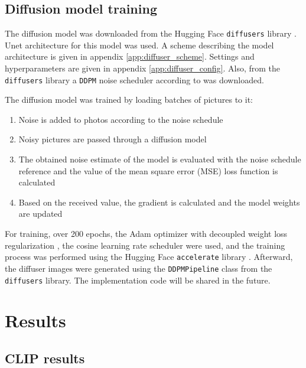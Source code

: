 \documentclass[runningheads]{llncs}
\begin{document}
\subsection{Diffusion model training}

The diffusion model was downloaded from the Hugging Face \texttt{diffusers} library \cite{von-platen-etal-2022-diffusers}. Unet architecture for this model was used. A scheme describing the model architecture is given in appendix \ref{app:diffuser_scheme}. Settings and hyperparameters are given in appendix \ref{app:diffuser_config}. Also, from the \texttt{diffusers} library a \texttt{DDPM} noise scheduler according to \cite{Diffusion_Ho} was downloaded.
\par
The diffusion model was trained by loading batches of pictures to it:
\begin{enumerate}
    \item Noise is added to photos according to the noise schedule
    \item Noisy pictures are passed through a diffusion model
    \item The obtained noise estimate of the model is evaluated with the noise schedule reference and the value of the mean square error (MSE) loss function is calculated
    \item Based on the received value, the gradient is calculated and the model weights are updated
\end{enumerate}
For training, over 200 epochs, the Adam optimizer \cite{Adam} with decoupled weight loss regularization \cite{AdamW}, the cosine learning rate scheduler \cite{CosineScheduler} were used, and the training process was performed using the Hugging Face \texttt{accelerate} library \cite{accelerate}. Afterward, the diffuser images were generated using the \texttt{DDPMPipeline} class from the \texttt{diffusers} library. The implementation code will be shared in the future.

\section{Results}

\subsection{CLIP results}
\end{document}
